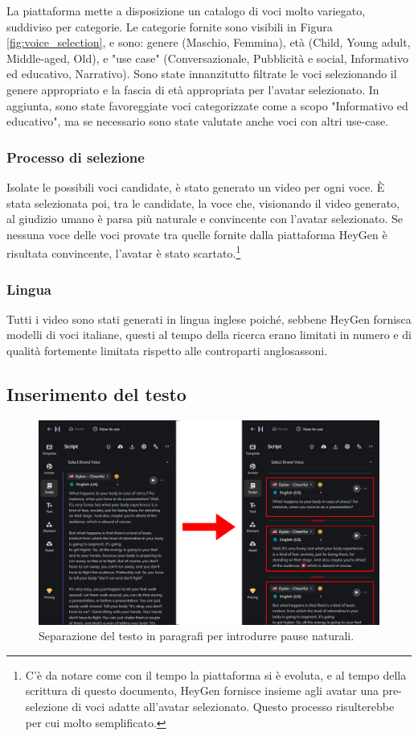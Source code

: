 La piattaforma mette a disposizione un catalogo di voci molto variegato, suddiviso per categorie. Le categorie fornite sono visibili in Figura \ref{fig:voice_selection}, e sono: genere (Maschio, Femmina), età (Child, Young adult, Middle-aged, Old), e "use case" (Conversazionale, Pubblicità e social, Informativo ed educativo, Narrativo). Sono state innanzitutto filtrate le voci selezionando il genere appropriato e la fascia di età appropriata per l'avatar selezionato. In aggiunta, sono state favoreggiate voci categorizzate come a scopo "Informativo ed educativo", ma se necessario sono state valutate anche voci con altri use-case.

\subsubsection{Processo di selezione}

Isolate le possibili voci candidate, è stato generato un video per ogni voce. È stata selezionata poi, tra le candidate, la voce che, visionando il video generato, al giudizio umano è parsa più naturale e convincente con l'avatar selezionato. Se nessuna voce delle voci provate tra quelle fornite dalla piattaforma HeyGen è risultata convincente, l'avatar è stato scartato.\footnote{C'è da notare come con il tempo la piattaforma si è evoluta, e al tempo della scrittura di questo documento, HeyGen fornisce insieme agli avatar una pre-selezione di voci adatte all'avatar selezionato. Questo processo risulterebbe per cui molto semplificato.}

\subsubsection{Lingua} Tutti i video sono stati generati in lingua inglese poiché, sebbene HeyGen fornisca modelli di voci italiane, questi al tempo della ricerca erano limitati in numero e di qualità fortemente limitata rispetto alle controparti anglosassoni.

\subsection{Inserimento del testo}

\begin{figure}[t]
    \centering
    \includegraphics[width=0.9\linewidth]{images/text_heygen}
    \caption{Separazione del testo in paragrafi per introdurre pause naturali.}
    \label{fig:text_heygen}
\end{figure}


